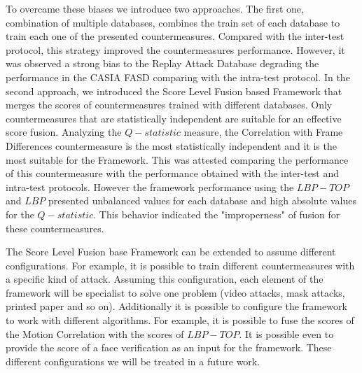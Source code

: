 To overcame these biases we introduce two approaches. The first one, combination of multiple databases, combines the train set of each database to train each one of the presented countermeasures. Compared with the inter-test protocol, this strategy improved the countermeasures performance. However, it was observed a strong bias to the Replay Attack Database degrading the performance in the CASIA FASD comparing with the intra-test protocol. In the second approach, we introduced the Score Level Fusion based Framework that merges the scores of countermeasures trained with different databases. Only countermeasures that are statistically independent are suitable for an effective score fusion. Analyzing the $Q-statistic$ measure, the Correlation with Frame Differences countermeasure is the most statistically independent and it is the most suitable for the Framework. This was attested comparing the performance of this countermeasure with the performance obtained with the inter-test and intra-test protocols.  However the framework performance using the $LBP-TOP$ and $LBP$ presented unbalanced values for each database and high absolute values for the $Q-statistic$. This behavior indicated the "improperness" of fusion for these countermeasures.

The Score Level Fusion base Framework can be extended to assume different configurations. For example, it is possible to train different countermeasures with a specific kind of attack. Assuming this configuration, each element of the framework will be specialist to solve one problem (video attacks, mask attacks, printed paper and so on).
Additionally it is possible to configure the framework to work with different algorithms. For example, it is possible to fuse the scores of the Motion Correlation with the scores of $LBP-TOP$. It is possible even to provide the score of a face verification as an input for the framework. These different configurations we will be treated in a future work.


